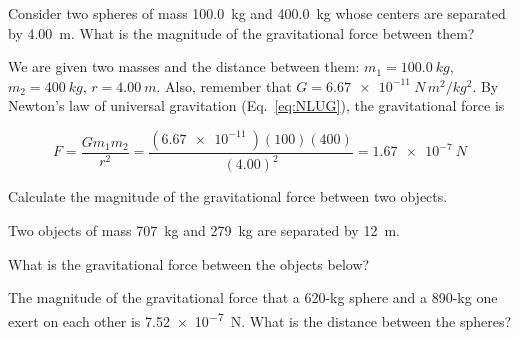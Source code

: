 \documentclass[main-physics.tex]{subfiles}
\begin{document}
\begin{example}
Consider two spheres of mass \SI{100.0}{kg} and \SI{400.0}{kg} whose centers are separated by \SI{4.00}{m}. What is the magnitude of the gravitational force between them?
\vspace{1ex}

\Solution We are given two masses and the distance between them: $m_1 = \SI{100.0}{kg}$, $m_2 = \SI{400}{kg}$, $r = \SI{4.00}{m}$. Also, remember that $G = \SI{6.67e-11}{N\,m^2/kg^2}$. By Newton's law of universal gravitation (Eq.~\ref{eq:NLUG}), the gravitational force is

\begin{equation*}
    F = \frac{G m_1 m_2}{r^2} = 
    \frac{\left(\SI{6.67e-11}{}\right) \left(100\right) \left(400\right)}{\left(4.00\right)^2} = 
    \SI{1.67e-7}{N}
\end{equation*}
\end{example}

\cyanhrule
\vspace{2ex}

Calculate the magnitude of the gravitational force between two objects.

\begin{exercise} \label{9DkhbB}
Two objects of mass \SI{707}{kg} and \SI{279}{kg} are separated by \SI{12}{m}. 
\end{exercise}



\begin{exercise} \label{MMnbpt}
What is the gravitational force between the objects below?
\vspace{-2em}

\begin{center}
    \centering
\end{center}
\end{exercise}

\begin{example}
    The magnitude of the gravitational force that a 620-kg sphere and a 890-kg one exert on each other is \SI{7.52e-7}{N}. What is the distance between the spheres?
\end{example}
\end{document}
